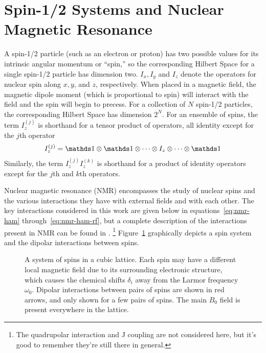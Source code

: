 \section{Spin-1/2 Systems and Nuclear Magnetic Resonance}

A spin-1/2 particle (such as an electron or proton) has two possible values for its intrinsic angular momentum or ``spin,'' so the corresponding Hilbert Space for a single spin-1/2 particle has dimension two. $I_x, I_y$ and $I_z$ denote the operators for nuclear spin along $x, y$, and $z$, respectively. When placed in a magnetic field, the magnetic dipole moment (which is proportional to spin) will interact with the field and the spin will begin to precess.
For a collection of $N$ spin-1/2 particles, the corresponding Hilbert Space has dimension $2^N$.
For an ensemble of spins, the term $I_z^{(j)}$ is shorthand for a tensor product of operators, all identity except for the $j$th operator
\[
I_z^{(j)} = \identity \otimes \identity \otimes \dots \otimes I_z \otimes \dots \otimes \identity
\]
Similarly, the term $I_z^{(j)}I_z^{(k)}$ is shorthand for a product of identity operators except for the $j$th and $k$th operators.

Nuclear magnetic resonance (NMR) encompasses the study of nuclear spins and the various interactions they have with external fields and with each other.
The key interactions considered in this work are given below in equations~\ref{eq:nmr-ham} through~\ref{eq:nmr-ham-rf}, but a complete description of the interactions present in NMR can be found in \cite{1976ii}.%
\footnote{The quadrupolar interaction and J coupling are not considered here, but it's good to remember they're still there in general.}
Figure~\ref{fig:spin-system} graphically depicts a spin system and the dipolar interactions between spins.

\begin{figure}[H]
    \centering
    
    \caption{A system of spins in a cubic lattice. Each spin may have a different local magnetic field due to its surrounding electronic structure, which causes the chemical shifts $\delta_i$ away from the Larmor frequency $\omega_0$. Dipolar interactions between pairs of spins are shown in red arrows, and only shown for a few pairs of spins. The main $B_0$ field is present everywhere in the lattice.}
    \label{fig:spin-system}
\end{figure}

